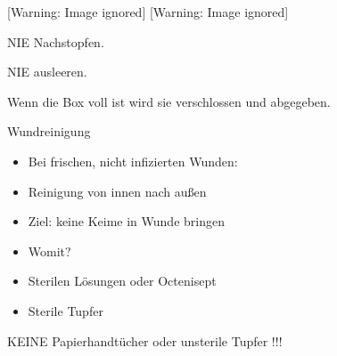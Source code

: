\documentclass{article}
\makeatletter
\newcommand\captionof[1]{\def\@captype{#1}\caption}
\makeatother
\begin{document}
\begin{center}
 [Warning: Image ignored] %
 [Warning: Image ignored] %
\captionof{figure}[Kontamed-Boxen, verschiedene
Fabrikate.]{Kontamed-Boxen, verschiedene Fabrikate.}

\end{center}
{\mdseries
NIE Nachstopfen.}

{\mdseries
NIE ausleeren.}

{\mdseries
Wenn die Box voll ist wird sie verschlossen und abgegeben.}

{\mdseries\color[rgb]{0.0,0.0,0.5019608}
Wundreinigung}

\begin{itemize}
\item {\mdseries
Bei frischen, nicht infizierten Wunden:}

\end{itemize}
\begin{itemize}
\item {\mdseries
Reinigung von innen nach au{\ss}en}

\item {\mdseries
Ziel: keine Keime in Wunde bringen}

\end{itemize}
\begin{itemize}
\item {\mdseries
Womit?}

\end{itemize}
\begin{itemize}
\item {\mdseries
Sterilen L\"osungen oder Octenisept}

\item {\mdseries
Sterile Tupfer}

\end{itemize}
{\mdseries
KEINE Papierhandt\"ucher oder unsterile Tupfer !!!}
\end{document}
